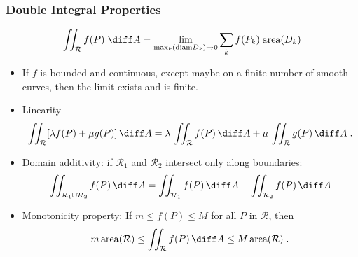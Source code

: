 \begin{frame}
\frametitle{Double Integral Properties}
\[
\iint_{\mathcal{R}} f(P) \; \diff A = \lim_{\max_k(\text{diam}D_k) \to 0} \sum_k f(P_k) \; \text{area}(D_k)
\]
\begin{itemize}
\item<2-> If $f$ is bounded and continuous, except maybe on a finite number of smooth curves, then the limit exists and is finite.
\item<3-> Linearity 
\[
\iint_{\mathcal{R}} [\lambda f(P) +\mu g(P)] \, \diff A = \lambda \, \iint_{\mathcal{R}} f(P) \, \diff A +\mu \, \iint_{\mathcal{R}} g(P) \, \diff A \; .
\]
\item<4-> Domain additivity: if $\mathcal{R}_1$ and $\mathcal{R}_2$ intersect only along boundaries:
\[
\iint_{\mathcal{R}_1\cup \mathcal{R}_2} f(P)\, \diff A = \iint_{\mathcal{R}_1} f(P)\, \diff A + \iint_{\mathcal{R}_2} f(P)\, \diff A 
\]
\item<5-> Monotonicity property: If $m \leq f(P) \leq M$ for all $P$ in $\mathcal{R}$, then
\[
m \, \text{area}(\mathcal{R}) \leq \iint_{\mathcal{R}} f(P)\, \diff A \leq M \, \text{area} (\mathcal{R})\; .
\]
\end{itemize}
\end{frame}